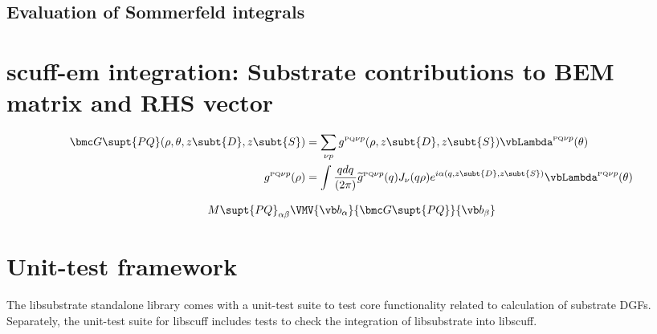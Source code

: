 \documentclass[letterpaper]{article}
\renewcommand{\wt}{\widetilde}
\begin{document}
\newpage
\subsection{Evaluation of Sommerfeld integrals}
\label{SommerfeldSection}

\newpage
\section{{\sc scuff-em} integration: Substrate contributions to
         BEM matrix and RHS vector}
\label{libscuffIntegrationSection}

\begin{align*}
 \bmc G\supt{PQ}(\rho, \theta, z\subt{D}, z\subt{S})
  &= \sum_{\nu p} 
      g^{\text{\tiny PQ}\nu p}(\rho, z\subt{D}, z\subt{S})
      \vbLambda^{\text{\tiny PQ}\nu p}(\theta)
\label{GPQExpression}
\\
g^{\text{\tiny PQ}\nu p}(\rho)
&=\int \frac{qdq}{(2\pi)}
       \wt{g}^{\text{\tiny PQ}\nu p}(q)
        J_\nu(q\rho) e^{i\alpha(q,z\subt{D},z\subt{S})} 
        \vbLambda^{\text{\tiny PQ}\nu p}(\theta)
\end{align*}

\begin{align*}
M\supt{PQ}_{\alpha\beta}
 \VMV{\vb b_\alpha}{\bmc G\supt{PQ}}{\vb b_\beta}
\end{align*}

\newpage
\section{Unit-test framework}

The {\sc libsubstrate} standalone library comes with
a unit-test suite to test core functionality related
to calculation of substrate DGFs. Separately, the
unit-test suite for {\sc libscuff} includes tests
to check the integration of {\sc libsubstrate} 
into {\sc libscuff}.
\end{document}
